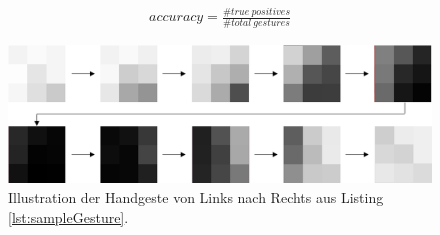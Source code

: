\begin{align}
    accuracy = \frac{\#true\ positives}{\#total\ gestures}
    \label{klisch_metric}
\end{align}
\begin{figure}[h!]
    \centering
    \includegraphics[width=\linewidth]{images/sample_gesture_total.jpg}
    \caption{Illustration der Handgeste von Links nach Rechts aus Listing \ref{lst:sampleGesture}.}
    \label{fig:sample_gesture}
\end{figure}